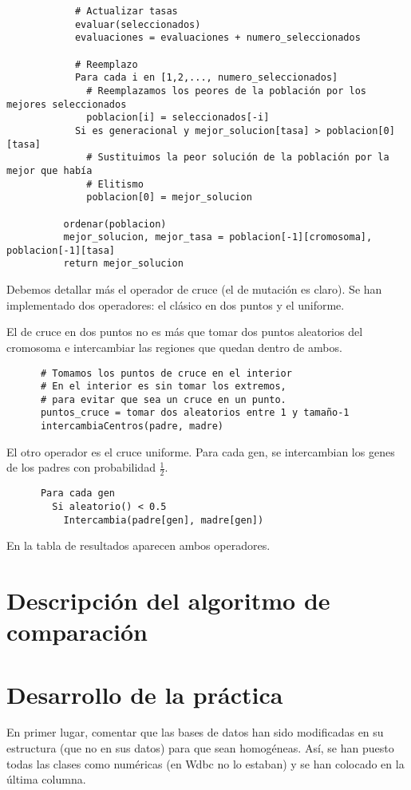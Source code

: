 \documentclass[a4paper, 11pt]{article}
\begin{document}
\begin{itemize}
\begin{verbatim}
            # Actualizar tasas
            evaluar(seleccionados)
            evaluaciones = evaluaciones + numero_seleccionados

            # Reemplazo
            Para cada i en [1,2,..., numero_seleccionados]
              # Reemplazamos los peores de la población por los mejores seleccionados
              poblacion[i] = seleccionados[-i]
            Si es generacional y mejor_solucion[tasa] > poblacion[0][tasa]
              # Sustituimos la peor solución de la población por la mejor que había
              # Elitismo
              poblacion[0] = mejor_solucion

          ordenar(poblacion)
          mejor_solucion, mejor_tasa = poblacion[-1][cromosoma], poblacion[-1][tasa]
          return mejor_solucion
        \end{verbatim}
    \end{itemize}

    Debemos detallar más el operador de cruce (el de mutación es claro). Se han implementado dos operadores: el clásico en dos puntos y el uniforme.

    El de cruce en dos puntos no es más que tomar dos puntos aleatorios del cromosoma e intercambiar las regiones que quedan dentro de ambos.

    \begin{verbatim}
      # Tomamos los puntos de cruce en el interior
      # En el interior es sin tomar los extremos,
      # para evitar que sea un cruce en un punto.
      puntos_cruce = tomar dos aleatorios entre 1 y tamaño-1
      intercambiaCentros(padre, madre)
    \end{verbatim}

    El otro operador es el cruce uniforme. Para cada gen, se intercambian los genes de los padres con probabilidad $\frac{1}{2}$.

    \begin{verbatim}
      Para cada gen
        Si aleatorio() < 0.5
          Intercambia(padre[gen], madre[gen])
    \end{verbatim}

    En la tabla de resultados aparecen ambos operadores.

  \section{Descripción del algoritmo de comparación}
    
  \section{Desarrollo de la práctica}
    En primer lugar, comentar que las bases de datos han sido modificadas en su estructura (que no en sus datos) para que sean homogéneas. Así, se han puesto todas las clases como numéricas (en Wdbc no lo estaban) y se han colocado en la última columna.
\end{document}
